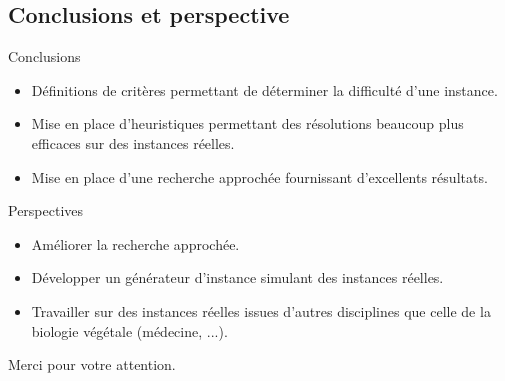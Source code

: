 \documentclass{beamer}
\begin{document}
\subsection{Conclusions  et perspective}
\begin{frame}{Conclusions}
	\begin{itemize}
		\item Définitions de critères permettant de déterminer la difficulté d'une instance.
		\pause
		\item Mise en place d'heuristiques permettant des résolutions beaucoup plus efficaces sur des instances réelles.
		\pause
		\item Mise en place d'une recherche approchée fournissant d'excellents résultats.
	\end{itemize}
\end{frame}

\begin{frame}{Perspectives}
	\begin{itemize}
		\item Améliorer la recherche approchée.
		\pause
		\item Développer un générateur d'instance simulant des instances réelles.
		\pause 
		\item Travailler sur des instances réelles issues d'autres disciplines que celle de la biologie végétale (médecine, ...).
	\end{itemize}
\end{frame}

\begin{frame}{}
\centering
Merci pour votre attention.
\end{frame}
\end{document}
